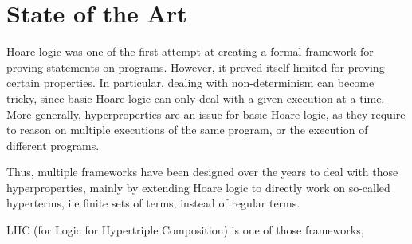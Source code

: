 \section{State of the Art}

Hoare logic was one of the first attempt at creating a formal framework for proving statements on programs. However, it proved itself limited for proving certain properties. In particular, dealing with non-determinism can become tricky, since basic Hoare logic can only deal with a given execution at a time. More generally, hyperproperties are an issue for basic Hoare logic, as they require to reason on multiple executions of the same program, or the execution of different programs.

Thus, multiple frameworks have been designed over the years to deal with those hyperproperties, mainly by extending Hoare logic to directly work on so-called hyperterms, i.e finite sets of terms, instead of regular terms.

LHC (for Logic for Hypertriple Composition) is one of those frameworks,